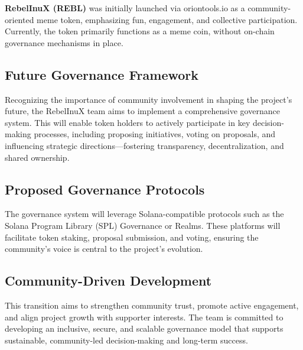 \documentclass{article}
\begin{document}
\begin{tcolorbox}[colback=headerColor!10!white, colframe=headerColor, boxrule=2pt, width=\textwidth, arc=6mm, left=8mm, right=8mm, top=6mm, bottom=6mm]
\smallskip
\textbf{\large RebelInuX (REBL)} was initially launched via oriontools.io as a community-oriented meme token, emphasizing fun, engagement, and collective participation. Currently, the token primarily functions as a meme coin, without on-chain governance mechanisms in place.

\subsection[
  \texorpdfstring{\color{primaryColor}Future Governance Framework}{Future Governance Framework}
]{\color{primaryColor}Future Governance Framework}

Recognizing the importance of community involvement in shaping the project's future, the RebelInuX team aims to implement a comprehensive governance system. This will enable token holders to actively participate in key decision-making processes, including proposing initiatives, voting on proposals, and influencing strategic directions—fostering transparency, decentralization, and shared ownership.

\subsection[
  \texorpdfstring{\color{primaryColor}Proposed Governance Protocols}{Proposed Governance Protocols}
]{\color{primaryColor}Proposed Governance Protocols}

The governance system will leverage Solana-compatible protocols such as the Solana Program Library (SPL) Governance or Realms. These platforms will facilitate token staking, proposal submission, and voting, ensuring the community’s voice is central to the project's evolution.

\subsection[
  \texorpdfstring{\color{primaryColor}Community-Driven Development}{Community-Driven Development}
]{\color{primaryColor}Community-Driven Development}

This transition aims to strengthen community trust, promote active engagement, and align project growth with supporter interests. The team is committed to developing an inclusive, secure, and scalable governance model that supports sustainable, community-led decision-making and long-term success.

\smallskip
\end{tcolorbox}
\end{document}
